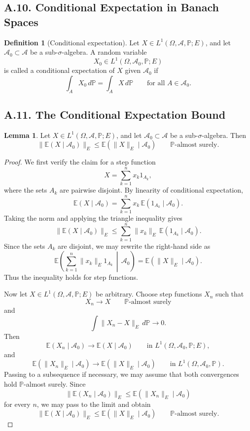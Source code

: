 \documentclass[11pt]{article}
\theoremstyle{definition}
\newtheorem{definition}{Definition}
\newtheorem{lemma}{Lemma}
\theoremstyle{remark}
\begin{document}
\subsection*{A.10. Conditional Expectation in Banach Spaces}
\begin{definition}[Conditional expectation]
Let \(X\in L^1(\Omega,\mathcal A,\mathbb P;E)\), and let \(\mathcal A_0\subset \mathcal A\) be a sub-\(\sigma\)-algebra. A random variable
\[
X_0\in L^1(\Omega,\mathcal A_0,\mathbb P;E)
\]
is called a conditional expectation of \(X\) given \(\mathcal A_0\) if
\[
\int_A X_0\,d\mathbb P=\int_A X\,d\mathbb P
\qquad \text{for all } A\in \mathcal A_0.
\]
\end{definition}

\subsection*{A.11. The Conditional Expectation Bound}
\begin{lemma}
Let \(X\in L^1(\Omega,\mathcal A,\mathbb P;E)\), and let \(\mathcal A_0\subset \mathcal A\) be a sub-\(\sigma\)-algebra. Then
\[
\|\mathbb E(X\mid \mathcal A_0)\|_E\le \mathbb E(\|X\|_E\mid \mathcal A_0)
\qquad \mathbb P\text{-almost surely.}
\]
\end{lemma}

\begin{proof}
We first verify the claim for a step function
\[
X=\sum_{k=1}^{n}x_k1_{A_k},
\]
where the sets \(A_k\) are pairwise disjoint. By linearity of conditional expectation,
\[
\mathbb E(X\mid \mathcal A_0)=\sum_{k=1}^{n}x_k\,\mathbb E(1_{A_k}\mid \mathcal A_0).
\]
Taking the norm and applying the triangle inequality gives
\[
\|\mathbb E(X\mid \mathcal A_0)\|_E
\le
\sum_{k=1}^{n}\|x_k\|_E\,\mathbb E(1_{A_k}\mid \mathcal A_0).
\]
Since the sets \(A_k\) are disjoint, we may rewrite the right-hand side as
\[
\mathbb E\left(\sum_{k=1}^{n}\|x_k\|_E1_{A_k}\,\middle|\,\mathcal A_0\right)
=
\mathbb E(\|X\|_E\mid \mathcal A_0).
\]
Thus the inequality holds for step functions.

Now let \(X\in L^1(\Omega,\mathcal A,\mathbb P;E)\) be arbitrary. Choose step functions \(X_n\) such that
\[
X_n\to X
\qquad \mathbb P\text{-almost surely}
\]
and
\[
\int \|X_n-X\|_E\,d\mathbb P\to 0.
\]
Then
\[
\mathbb E(X_n\mid \mathcal A_0)\to \mathbb E(X\mid \mathcal A_0)
\qquad \text{in } L^1(\Omega,\mathcal A_0,\mathbb P;E),
\]
and
\[
\mathbb E(\|X_n\|_E\mid \mathcal A_0)\to \mathbb E(\|X\|_E\mid \mathcal A_0)
\qquad \text{in } L^1(\Omega,\mathcal A_0,\mathbb P).
\]
Passing to a subsequence if necessary, we may assume that both convergences hold \(\mathbb P\)-almost surely. Since
\[
\|\mathbb E(X_n\mid \mathcal A_0)\|_E\le \mathbb E(\|X_n\|_E\mid \mathcal A_0)
\]
for every \(n\), we may pass to the limit and obtain
\[
\|\mathbb E(X\mid \mathcal A_0)\|_E\le \mathbb E(\|X\|_E\mid \mathcal A_0)
\qquad \mathbb P\text{-almost surely.}
\]
\end{proof}
\end{document}
